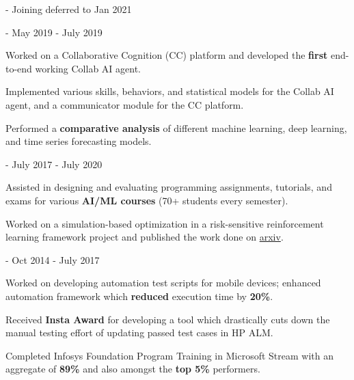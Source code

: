 \documentclass[11pt, a4paper]{awesome-cv}
\begin{document}
\begin{cventries}
		\cventry
	{ - }
	{}
	{}
	{Joining deferred to Jan 2021}
	{}
	\vspace{-4mm}
	
	\cventry
	{ - }
	{}
	{}
	{May 2019 - July 2019}
	{
		\begin{cvitems}
			\item{{Worked on a Collaborative Cognition (CC) platform and developed the \textbf{first} end-to-end working Collab AI agent.}}
			\item {{Implemented various skills, behaviors, and statistical models for the Collab AI agent, and a communicator module for the CC platform.}}
			\item{{Performed a \textbf{comparative analysis} of different machine learning, deep learning, and time series forecasting models.}}
		\end{cvitems}
	}
	\cventry
	{ - }
	{}
	{}
	{July 2017 - July 2020}
	{
	\begin{cvitems}
		\item {{Assisted in designing and evaluating programming assignments, tutorials, and exams for various \textbf{AI/ML courses} (70+ students every semester).
			}}
		\item {{Worked on a simulation-based optimization in a risk-sensitive reinforcement learning framework project and published the work done on \href{https://arxiv.org/abs/2002.11440}{arxiv}.}}
	\end{cvitems}
	}
	\cventry
	{ - }
	{}
	{}
	{Oct 2014 - July 2017}
	{
	\begin{cvitems}
		\item {{Worked on developing automation test scripts for mobile devices; {enhanced} automation framework which \textbf{reduced} execution time by \textbf{20\%}.}}
		\item {{Received \textbf{Insta Award} for developing a tool which drastically cuts down the manual testing effort of updating passed test cases in HP ALM.}}
		\item {{Completed Infosys Foundation Program Training in Microsoft Stream with an aggregate of \textbf{89\%} and also amongst the \textbf{top 5\%} performers.}}
	\end{cvitems}
		}
\end{cventries}
\end{document}
